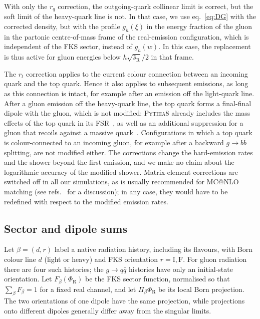 \documentclass[a4paper,11pt]{article}
\makeatletter
\newcommand{\mcatnlo}{MC@NLO\xspace}
\newcommand{\pythia}{\textsc{Pythia8}\xspace}
\newcommand{\PhiR}{\Phi_{\mathrm{R}}}
\makeatother
\begin{document}
With only the $r_q$ correction, the outgoing-quark collinear limit is
correct, but the soft limit of the heavy-quark line is not. In that
case, we use eq.~\eqref{eq:DG} with the corrected density, but with
the profile $g_h(\xi)$ in the energy fraction of the gluon in the
partonic centre-of-mass frame of the real-emission configuration,
which is independent of the FKS sector, instead of $g_h(w)$. In this
case, the replacement is thus active for gluon energies below
$h\sqrt{\hat s_{\mathrm{R}}}/2$ in that frame.

The $r_t$ correction applies to the current colour connection between
an incoming quark and the top quark. Hence it also applies to
subsequent emissions, as long as this connection is intact, for
example after an emission off the light-quark line. After a gluon
emission off the heavy-quark line, the top quark forms a final-final
dipole with the gluon, which is not modified: \pythia already includes
the mass effects of the top quark in its FSR~\cite{Norrbin:2000uu}, as
well as an additional suppression for a gluon that recoils against a
massive quark~\cite{Bierlich:2022pfr}. Configurations in which a top quark is
colour-connected to an incoming gluon, for example after a backward
$g\to b\bar b$ splitting, are not modified either. The corrections
change the hard-emission rates and the shower beyond the first
emission, and we make no claim about the logarithmic accuracy of the
modified shower. Matrix-element corrections are switched off in all
our simulations, as is usually recommended for \mcatnlo matching (see
refs.~\cite{Frixione:2023hwz,Frederix:2024psm} for a discussion); in
any case, they would have to be redefined with respect to the modified
emission rates.

\subsection{Sector and dipole sums}
\label{sec:sectorsums}

Let $\beta=(d,r)$ label a native radiation history, including its
flavours, with Born colour line $d$ (light or heavy) and FKS orientation
$r=\mathrm{I},\mathrm{F}$. For gluon radiation there are four such
histories; the $g\to q\bar q$ histories have only an initial-state
orientation. Let $F_\beta(\PhiR)$ be the FKS sector function, normalised
so that $\sum_\beta F_\beta=1$ for a fixed real channel, and let
$\Pi_\beta\PhiR$ be its local Born projection. The two orientations
of one dipole have the same projection, while projections onto
different dipoles generally differ away from the singular limits.
\end{document}

